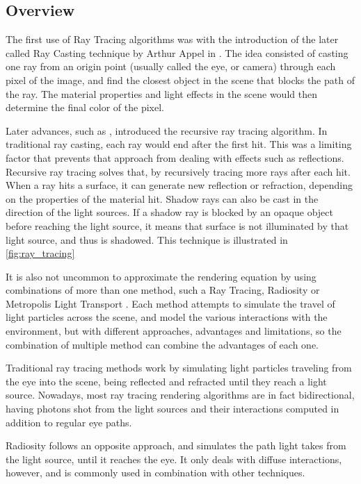 \documentclass[main.tex]{subfiles}
\begin{document}
\subsection{Overview}

The first use of Ray Tracing algorithms was with the introduction of the later called Ray Casting technique by Arthur Appel in \cite{appel1968some}. The idea consisted of casting one ray from an origin point (usually called the eye, or camera) through each pixel of the image, and find the closest object in the scene that blocks the path of the ray. The material properties and light effects in the scene would then determine the final color of the pixel.

Later advances, such as \cite{whitted2005improved}, introduced the recursive ray tracing algorithm. In traditional ray casting, each ray would end after the first hit. This was a limiting factor that prevents that approach from dealing with effects such as reflections. Recursive ray tracing solves that, by recursively tracing more rays after each hit. When a ray hits a surface, it can generate new reflection or refraction, depending on the properties of the material hit. Shadow rays can also be cast in the direction of the light sources. If a shadow ray is blocked by an opaque object before reaching the light source, it means that surface is not illuminated by that light source, and thus is shadowed. This technique is illustrated in \cref{fig:ray_tracing}




It is also not uncommon to approximate the rendering equation by using combinations of more than one method, such a Ray Tracing, Radiosity or Metropolis Light Transport \cite{wallace1987two,veach1997metropolis}. Each method attempts to simulate the travel of light particles across the scene, and model the various interactions with the environment, but with different approaches, advantages and limitations, so the combination of multiple method can combine the advantages of each one.


Traditional ray tracing methods work by simulating light particles traveling from the eye into the scene, being reflected and refracted until they reach a light source. Nowadays, most ray tracing rendering algorithms are in fact bidirectional, having photons shot from the light sources and their interactions computed in addition to regular eye paths.

Radiosity follows an opposite approach, and simulates the path light takes from the light source, until it reaches the eye. It only deals with diffuse interactions, however, and is commonly used in combination with other techniques.
\end{document}
